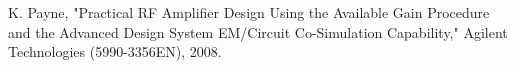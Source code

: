 \documentclass[conference]{IEEEtran}
\begin{document}
\begin{thebibliography}{1}
K. Payne, "Practical RF Amplifier Design Using the Available Gain Procedure and the Advanced Design System EM/Circuit Co-Simulation Capability," Agilent Technologies (5990-3356EN), 2008.
\end{thebibliography}
\end{document}
